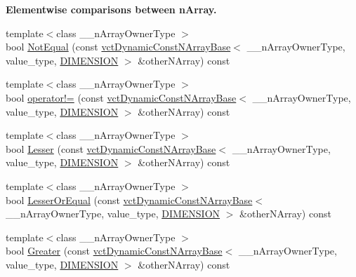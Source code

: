\begin{Indent}{\bf Elementwise comparisons between n\+Array.}
\begin{DoxyCompactItemize}
{\footnotesize template$<$class \+\_\+\+\_\+n\+Array\+Owner\+Type $>$ }\\bool \hyperlink{classvct_dynamic_const_n_array_base_acbfcf853b7958a88a801fec6e5596074}{Not\+Equal} (const \hyperlink{classvct_dynamic_const_n_array_base}{vct\+Dynamic\+Const\+N\+Array\+Base}$<$ \+\_\+\+\_\+n\+Array\+Owner\+Type, value\+\_\+type, \hyperlink{classvct_dynamic_const_n_array_base_a815ac316ebc1bb2ab1969d307549826faf759c9ab831ff929b89af4ea2865a378}{D\+I\+M\+E\+N\+S\+I\+O\+N} $>$ \&other\+N\+Array) const 
\item 
{\footnotesize template$<$class \+\_\+\+\_\+n\+Array\+Owner\+Type $>$ }\\bool \hyperlink{classvct_dynamic_const_n_array_base_a0ed74e43fb1fd1fd3d018d354be08c4c}{operator!=} (const \hyperlink{classvct_dynamic_const_n_array_base}{vct\+Dynamic\+Const\+N\+Array\+Base}$<$ \+\_\+\+\_\+n\+Array\+Owner\+Type, value\+\_\+type, \hyperlink{classvct_dynamic_const_n_array_base_a815ac316ebc1bb2ab1969d307549826faf759c9ab831ff929b89af4ea2865a378}{D\+I\+M\+E\+N\+S\+I\+O\+N} $>$ \&other\+N\+Array) const 
\item 
{\footnotesize template$<$class \+\_\+\+\_\+n\+Array\+Owner\+Type $>$ }\\bool \hyperlink{classvct_dynamic_const_n_array_base_a699304a68d5f14a37ee307ff880a7769}{Lesser} (const \hyperlink{classvct_dynamic_const_n_array_base}{vct\+Dynamic\+Const\+N\+Array\+Base}$<$ \+\_\+\+\_\+n\+Array\+Owner\+Type, value\+\_\+type, \hyperlink{classvct_dynamic_const_n_array_base_a815ac316ebc1bb2ab1969d307549826faf759c9ab831ff929b89af4ea2865a378}{D\+I\+M\+E\+N\+S\+I\+O\+N} $>$ \&other\+N\+Array) const 
\item 
{\footnotesize template$<$class \+\_\+\+\_\+n\+Array\+Owner\+Type $>$ }\\bool \hyperlink{classvct_dynamic_const_n_array_base_a7129dce6546d6ff7bced8637c43513df}{Lesser\+Or\+Equal} (const \hyperlink{classvct_dynamic_const_n_array_base}{vct\+Dynamic\+Const\+N\+Array\+Base}$<$ \+\_\+\+\_\+n\+Array\+Owner\+Type, value\+\_\+type, \hyperlink{classvct_dynamic_const_n_array_base_a815ac316ebc1bb2ab1969d307549826faf759c9ab831ff929b89af4ea2865a378}{D\+I\+M\+E\+N\+S\+I\+O\+N} $>$ \&other\+N\+Array) const 
\item 
{\footnotesize template$<$class \+\_\+\+\_\+n\+Array\+Owner\+Type $>$ }\\bool \hyperlink{classvct_dynamic_const_n_array_base_aba767cde89524f3df3fed74bfce09657}{Greater} (const \hyperlink{classvct_dynamic_const_n_array_base}{vct\+Dynamic\+Const\+N\+Array\+Base}$<$ \+\_\+\+\_\+n\+Array\+Owner\+Type, value\+\_\+type, \hyperlink{classvct_dynamic_const_n_array_base_a815ac316ebc1bb2ab1969d307549826faf759c9ab831ff929b89af4ea2865a378}{D\+I\+M\+E\+N\+S\+I\+O\+N} $>$ \&other\+N\+Array) const 

\end{DoxyCompactItemize}
\end{Indent}
